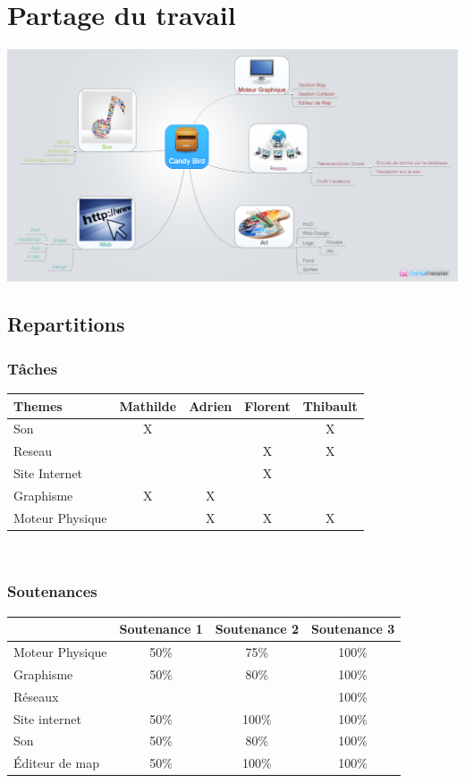 \documentclass [11pt]{report}
\begin{document}
\chapter {Partage du travail}
\begin{center}
\includegraphics[scale=0.3]{images/Candy_Bird.png}
\end{center}

\newpage 

	\section{Repartitions}
		\subsection{Tâches}
			\begin{tabular}{| l |*{4} {c|}}
				\hline
				Themes & Mathilde & Adrien & Florent & Thibault \\
				\hline
				Son & X & & & X \\
				\hline
				Reseau & & & X & X \\
				\hline
				Site Internet & & & X & \\
				\hline
				Graphisme & X & X & & \\
				\hline
				Moteur Physique & & X & X & X\\
				\hline
			\end{tabular}\\\vspace{3mm}


		\subsection{Soutenances}
			\begin{tabular}{| l | * {3}{c|}}
				\hline
		 		& Soutenance 1 & Soutenance 2 & Soutenance 3 \\
				\hline
				Moteur Physique & 50\% & 75\% & 100\% \\
				\hline
				 Graphisme & 50\% & 80\% & 100\% \\
				\hline
				Réseaux & & & 100\% \\
				\hline
				Site internet & 50\% & 100\%  & 100\%  \\
	          			 \hline
				Son & 50\% & 80\% & 100\% \\
				\hline
				\'Editeur de map & 50\% & 100\% & 100\% \\
				\hline
			\end{tabular}\\\vspace{4mm}
\end{document}
